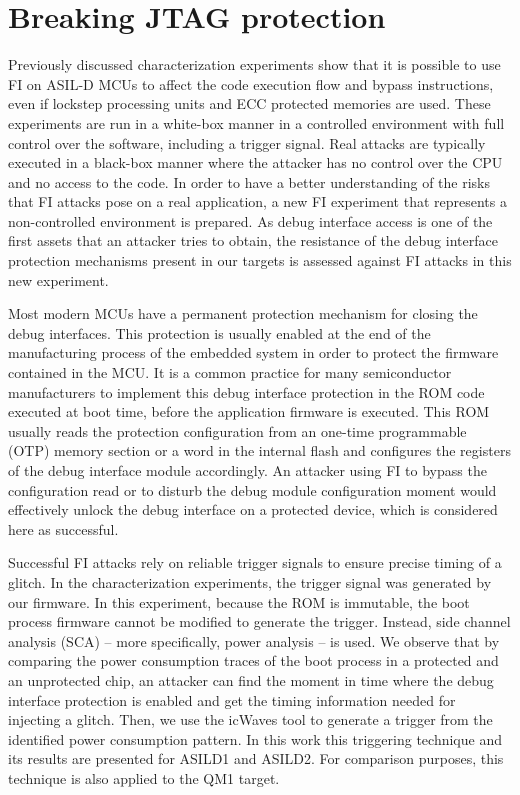 \documentclass[10pt, conference, compsocconf]{IEEEtran}
\newcommand{\TI}{ASILD1\xspace}
\newcommand{\ST}{ASILD2\xspace}
\newcommand{\NXP}{QM1\xspace}
\begin{document}
\section{Breaking JTAG protection}
\label{sec:jtag}
Previously discussed characterization experiments show that it is possible to use FI on ASIL-D MCUs to affect the code execution flow and bypass instructions, even if lockstep processing units and ECC protected memories are used. These experiments are run in a white-box manner in a controlled environment with full control over the software, including a trigger signal. Real attacks are typically executed in a black-box manner where the attacker has no control over the CPU and no access to the code.  In order to have a better understanding of the risks that FI attacks pose on a real application, a new FI experiment that represents a non-controlled environment is prepared. As debug interface access is one of the first assets that an attacker tries to obtain, the resistance of the debug interface protection mechanisms present in our targets is assessed against FI attacks in this new experiment.

Most modern MCUs have a permanent protection mechanism for closing the debug interfaces. This protection is usually enabled at the end of the manufacturing process of the embedded system in order to protect the firmware contained in the MCU. It is a common practice for many semiconductor manufacturers to implement this debug interface protection in the ROM code executed at boot time, before the application firmware is executed. This ROM usually reads the protection configuration from an one-time programmable (OTP) memory section or a word in the internal flash and configures the registers of the debug interface module accordingly. An attacker using FI to bypass the configuration read or to disturb the debug module configuration moment would effectively unlock the debug interface on a protected device, which is considered here as successful. 

Successful FI attacks rely on reliable trigger signals to ensure precise timing of a glitch. In the characterization experiments, the trigger signal was generated by our firmware. In this experiment, because the ROM is immutable, the boot process firmware cannot be modified to generate the trigger. Instead, side channel analysis (SCA) -- more specifically, power analysis -- is used. 
We observe that by comparing the power consumption traces of the boot process in a protected and an unprotected chip, an attacker can find the moment in time where the debug interface protection is enabled and get the timing information needed for injecting a glitch. Then, we use the icWaves tool to generate a trigger from the identified power consumption pattern. In this work this triggering technique and its results are presented for \TI and \ST. For comparison purposes, this technique is also applied to the \NXP target.
\end{document}
